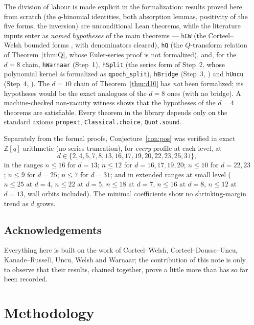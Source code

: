 \documentclass[11pt]{article}
\newcommand{\ZZ}{\mathbb{Z}}
\begin{document}
The division of labour is made explicit in the formalization: results
proved here from scratch (the $q$-binomial identities, both absorption
lemmas, positivity of the five forms, the inversion) are unconditional
Lean theorems, while the literature inputs enter as \emph{named
hypotheses} of the main theorems --- \texttt{hCW} (the Corteel--Welsh
bounded forms \cite[Theorem~1.2]{CW19}, with denominators cleared),
\texttt{hQ} (the $Q$-transform relation of Theorem~\ref{thm:Q}, whose
Euler-series proof is not formalized), and, for the $d=8$ chain,
\texttt{hWarnaar} (Step~1), \texttt{hSplit} (the series form of Step~2,
whose polynomial kernel \emph{is} formalized as \texttt{qpoch\_split}),
\texttt{hBridge} (Step~3, \cite[Lemma~9.2]{KR22}) and \texttt{hUncu}
(Step~4, \cite[Theorem~4.3]{Uncu23}). The $d=10$ chain of
Theorem~\ref{thm:d10} has \emph{not} been formalized; its hypotheses
would be the exact analogues of the $d=8$ ones (with no bridge). A
machine-checked non-vacuity
witness shows that the hypotheses of the $d=4$ theorems are satisfiable.
Every theorem in the library depends only on the standard axioms
\texttt{propext}, \texttt{Classical.choice}, \texttt{Quot.sound}.

Separately from the formal proofs, Conjecture~\ref{con:pos} was verified
in exact $\ZZ[q]$ arithmetic (no series truncation), for \emph{every}
profile at each level, at
\[
d\in\{2,4,5,7,8,13,16,17,19,20,22,23,25,31\},
\]
in the ranges $n\le16$ for $d=13$; $n\le12$ for $d=16,17,19,20$;
$n\le10$ for $d=22,23$; $n\le9$ for $d=25$; $n\le7$ for $d=31$; and in
extended ranges at small level ($n\le25$ at $d=4$, $n\le22$ at $d=5$,
$n\le18$ at $d=7$, $n\le16$ at $d=8$, $n\le12$ at $d=13$, wall orbits
included). The minimal coefficients show no shrinking-margin trend as
$d$ grows.

\subsection*{Acknowledgements}
Everything here is built on the work of Corteel--Welsh,
Corteel--Dousse--Uncu, Kanade--Russell, Uncu, Welsh and Warnaar; the
contribution of this note is only to observe that their results, chained
together, prove a little more than has so far been recorded.

\appendix

\section{Methodology}\label{app:method}
\end{document}
